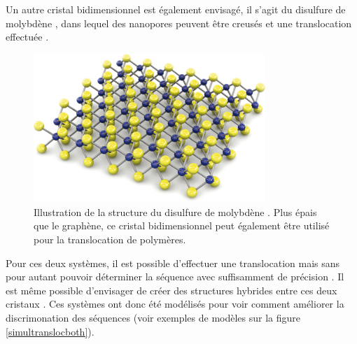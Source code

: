 Un autre cristal bidimensionnel est également envisagé, il s'agit du disulfure de molybdène \cite{Kang2014}, dans lequel des nanopores peuvent être creusés \cite{Feng2015} et une translocation effectuée \cite{2Feng2015}.

\begin{figure}[h!]
\begin{center}
\includegraphics[width=0.78\textwidth]{MoS2.jpg}


\caption[Disulfure de molybdène]{Illustration de la structure du disulfure de molybdène \cite{Benameur2011}. Plus épais que le graphène, ce cristal bidimensionnel peut également être utilisé pour la translocation de polymères.}
\label{membvibmos2}
\end{center}
\end{figure}

Pour ces deux systèmes, il est possible d'effectuer une translocation mais sans pour autant pouvoir déterminer la séquence avec suffisamment de précision \cite{Schneider2010,2Feng2015}. Il est même possible d'envisager de créer des structures hybrides entre ces deux cristaux \cite{Roy2013}. Ces systèmes ont donc été modélisés pour voir comment améliorer la discrimonation des séquences (voir exemples de modèles sur la figure \ref{simultranslocboth}).

